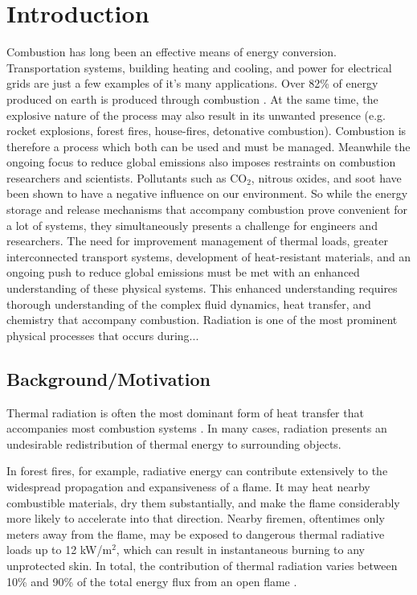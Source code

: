 \addchapheadtotoc

\chapter{Introduction} \label{chapter:Introduction}
Combustion has long been an effective means of energy conversion. Transportation systems, building heating and cooling, and power for electrical grids are just a few examples of it's many applications. Over 82\% of energy produced on earth is produced through combustion \cite{2021BpEnergy}. 
At the same time, the explosive nature of the process may also result in its unwanted presence (e.g. rocket explosions, forest fires, house-fires, detonative combustion).
Combustion is therefore a process which both can be used and must be managed. 
Meanwhile the ongoing focus to reduce global emissions also imposes restraints on combustion researchers and scientists. Pollutants such as CO${}_2$, nitrous oxides, and soot have been shown to have a negative influence on our environment.
So while the energy storage and release mechanisms that accompany combustion prove convenient for a lot of systems, they simultaneously presents a challenge for engineers and researchers.
The need for improvement management of thermal loads, greater interconnected transport systems, development of heat-resistant materials, and an ongoing push to reduce global emissions must be met with an enhanced understanding of these physical systems.
This enhanced understanding requires thorough understanding of the complex fluid dynamics, heat transfer, and chemistry that accompany combustion.
Radiation is one of the most prominent physical processes that occurs during... 


\section{Background/Motivation}
Thermal radiation is often the most dominant form of heat transfer that accompanies most combustion systems \cite{Coelho2018RadiativeSystems}. In many cases, radiation presents an undesirable redistribution of thermal energy to surrounding objects.

In forest fires, for example, radiative energy can contribute extensively to the widespread propagation and expansiveness of a flame. 
It may heat nearby combustible materials, dry them substantially, and make the flame considerably more likely to accelerate into that direction. 
Nearby firemen, oftentimes only meters away from the flame, may be exposed to dangerous thermal radiative loads up to 12 kW/m$^2$, which can result in instantaneous burning to any unprotected skin.
In total, the contribution of thermal radiation varies between 10\% and 90\% of the total energy flux from an open flame \cite{Valendik2008EffectEnvironment}.

